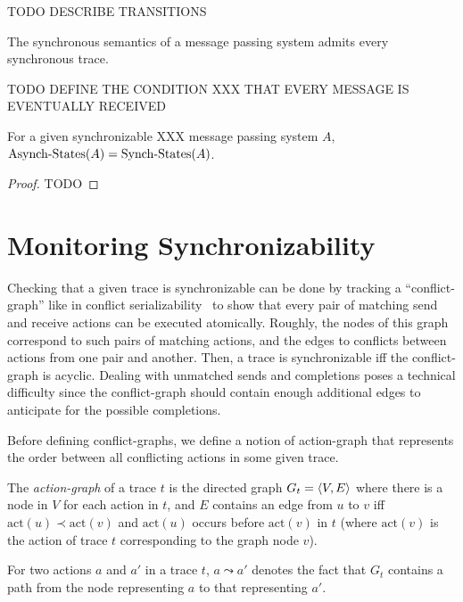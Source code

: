TODO DESCRIBE TRANSITIONS 

\begin{lemma}\label{lem:sync_traces}
The synchronous semantics of a message passing system admits every synchronous trace.
\end{lemma}

TODO DEFINE THE CONDITION XXX THAT EVERY MESSAGE IS EVENTUALLY RECEIVED

\begin{lemma}
For a given synchronizable XXX message passing system $A$, $\mathrm{Asynch}\text{-}\mathrm{States}(A)=\mathrm{Synch}\text{-}\mathrm{States}(A)$.
\end{lemma}
\begin{proof}
TODO 
\end{proof}

\section{Monitoring Synchronizability}

Checking that a given trace is synchronizable can be done by tracking a ``conflict-graph'' like in conflict serializability~\cite{}
to show that every pair of matching send and receive actions can be executed atomically. Roughly, the nodes of this graph
correspond to such pairs of matching actions, and the edges to conflicts between actions from one pair and another. 
Then, a trace is synchronizable if{f} the conflict-graph is acyclic. Dealing with unmatched sends and completions 
poses a technical difficulty since the conflict-graph should contain enough additional edges
to anticipate for the possible completions. 

Before defining conflict-graphs, we define a notion of action-graph that represents the order between all conflicting actions in some given trace.

\begin{definition}\label{def:pr_graphs}
    The \emph{action-graph} of a trace $t$ is the directed graph 
    $G_t = \left\langle {V,E} \right\rangle$ where there is a node in $V$ for each action in $t$, and $E$ 
    contains an edge from $u$ to $v$ iff $\mathrm{act}(u) \prec \mathrm{act}(v)$ and $\mathrm{act}(u)$ occurs before $\mathrm{act}(v)$ in $t$ (where $\mathrm{act}(v)$ is the action of trace $t$ corresponding to the graph node $v$).
\end{definition}
For two actions $a$ and $a'$ in a trace $t$, $a\leadsto a'$ denotes the fact that $G_t$ contains a path from the node representing $a$ to that representing $a'$.

